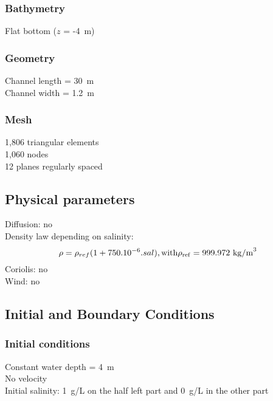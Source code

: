 \subsubsection{Bathymetry}
%
Flat bottom ($z$ = -4~m)
%
\subsubsection{Geometry}
%
Channel length = 30~m\\
Channel width = 1.2~m
%
\subsubsection{Mesh}
%
1,806 triangular elements\\
1,060 nodes\\
12 planes regularly spaced
%
%
%
\subsection{Physical parameters}
%
Diffusion: no\\
Density law depending on salinity:
\begin{equation}
\rho = \rho_{ref} (1 + 750.10^{-6} . sal ),
\rm{with} \rho_{ref} = 999.972~\rm{kg/m}^3
\end{equation}
Coriolis: no\\
Wind: no
%
%
%
%
%
%
\subsection{Initial and Boundary Conditions}
%
\subsubsection{Initial conditions}
%
Constant water depth = 4~m\\
No velocity\\
Initial salinity: 1~g/L on the half left part and 0~g/L in the other
part
%
